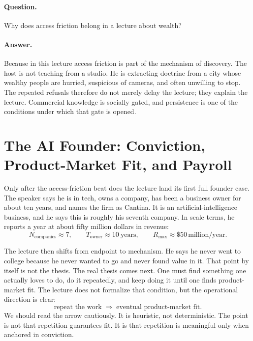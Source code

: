 \paragraph{Question.} Why does access friction belong in a lecture about wealth?

\paragraph{Answer.} Because in this lecture access friction is part of the mechanism of discovery. The host is not teaching from a studio. He is extracting doctrine from a city whose wealthy people are hurried, suspicious of cameras, and often unwilling to stop. The repeated refusals therefore do not merely delay the lecture; they explain the lecture. Commercial knowledge is socially gated, and persistence is one of the conditions under which that gate is opened.

\section{The AI Founder: Conviction, Product-Market Fit, and Payroll}

Only after the access-friction beat does the lecture land its first full founder case. The speaker says he is in tech, owns a company, has been a business owner for about ten years, and names the firm as Cantina. It is an artificial-intelligence business, and he says this is roughly his seventh company. In scale terms, he reports a year at about fifty million dollars in revenue:
\begin{equation}
N_{\text{companies}} \approx 7,\qquad
T_{\text{owner}} \approx 10\ \text{years},\qquad
R_{\max} \approx \$50\,\text{million/year}.
\end{equation}

The lecture then shifts from endpoint to mechanism. He says he never went to college because he never wanted to go and never found value in it. That point by itself is not the thesis. The real thesis comes next. One must find something one actually loves to do, do it repeatedly, and keep doing it until one finds product-market fit. The lecture does not formalize that condition, but the operational direction is clear:
\begin{equation}
\text{repeat the work} \;\Rightarrow\; \text{eventual product-market fit}.
\end{equation}
We should read the arrow cautiously. It is heuristic, not deterministic. The point is not that repetition guarantees fit. It is that repetition is meaningful only when anchored in conviction.

